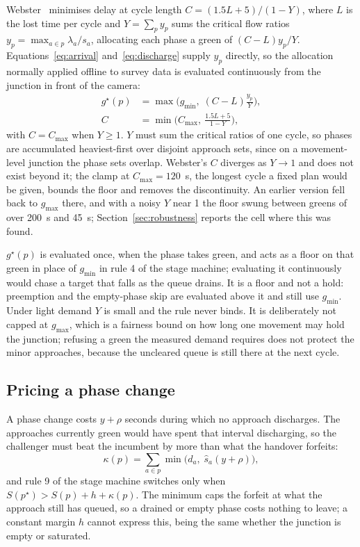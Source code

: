 \documentclass[journal]{IEEEtran}
\begin{document}
Webster~\cite{Webster1958TrafficSignalSettings} minimises delay at cycle length $C = (1.5L + 5)/(1 - Y)$, where
$L$ is the lost time per cycle and $Y = \sum_p y_p$ sums the critical flow ratios
$y_p = \max_{a \in p} \lambda_a / s_a$, allocating each phase a green of $(C - L)y_p/Y$. Equations~\eqref{eq:arrival} and~\eqref{eq:discharge} supply $y_p$ directly, so the allocation normally
applied offline to survey data is evaluated continuously from the junction in front of the camera:
\begin{align}
g^\star(p) &= \max\!\Big(g_{\min},\; (C - L)\frac{y_p}{Y}\Big),
\label{eq:floor}\\
C &= \min\!\Big(C_{\max},\ \frac{1.5L + 5}{1 - Y}\Big),
\label{eq:cycle}
\end{align}
with $C = C_{\max}$ when $Y \geq 1$. $Y$ must sum the critical ratios of one cycle, so phases are accumulated heaviest-first over disjoint
approach sets, since on a movement-level junction the phase sets overlap. Webster's $C$ diverges as $Y \to 1$ and does not exist
beyond it; the clamp at $C_{\max} = 120$~s, the longest cycle a fixed plan would be given, bounds the floor and
removes the discontinuity. An earlier version fell back to $g_{\max}$ there, and with a noisy $Y$ near 1 the floor swung between
greens of over 200~s and 45~s; Section~\ref{sec:robustness} reports the cell where this was found.

$g^\star(p)$ is evaluated once, when the phase takes green, and acts as a floor on that green in place of
$g_{\min}$ in rule 4 of the stage machine; evaluating it continuously would chase a target that falls as the
queue drains. It is a floor and not a hold: preemption and the empty-phase skip are evaluated above it and
still use $g_{\min}$. Under light demand $Y$ is small and the rule never binds. It is deliberately not capped
at $g_{\max}$, which is a fairness bound on how long one movement may hold the junction; refusing a green the
measured demand requires does not protect the minor approaches, because the uncleared queue is still there
at the next cycle.

\subsection{Pricing a phase change}
\label{sec:cost}

A phase change costs $y + \rho$ seconds during which no approach discharges. The approaches currently green
would have spent that interval discharging, so the challenger must beat the incumbent by more than what the
handover forfeits:
\begin{equation}
\kappa(p) = \sum_{a \in p} \min\bigl(d_a,\; \hat{s}_a (y + \rho)\bigr),
\label{eq:switchcost}
\end{equation}
and rule 9 of the stage machine switches only when $S(p^\star) > S(p) + h + \kappa(p)$. The minimum caps the forfeit at what the approach still has queued, so a drained or empty phase costs
nothing to leave; a constant margin $h$ cannot express this, being the same whether the junction is empty or
saturated.
\end{document}
